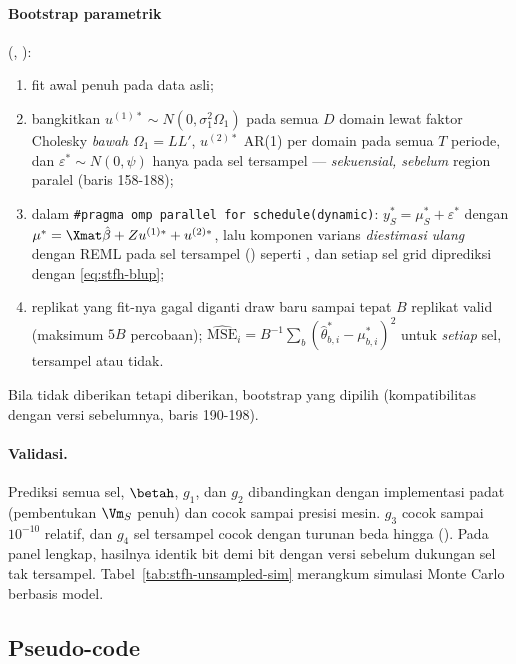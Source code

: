 \paragraph{Bootstrap parametrik} (,
):
\begin{enumerate}[label=\arabic*.]
  \item fit awal penuh pada data asli;
  \item bangkitkan $u^{(1)\ast}\sim N(0,\sigma_1^2\Omega_1)$ pada semua $D$
        domain lewat faktor Cholesky \emph{bawah} $\Omega_1=LL'$, $u^{(2)\ast}$
        AR(1) per domain pada semua $T$ periode, dan $\varepsilon^\ast\sim
        N(0,\psi)$ hanya pada sel tersampel --- \emph{sekuensial, sebelum}
        region paralel (baris 158-188);
  \item dalam \texttt{\#pragma omp parallel for schedule(dynamic)}:
        $y_S^\ast=\mu^\ast_S+\varepsilon^\ast$ dengan
        $\mu^\ast=\Xmat\hat\beta+Zu^{(1)\ast}+u^{(2)\ast}$, lalu komponen
        varians \emph{diestimasi ulang} dengan REML pada sel tersampel
        () seperti , dan setiap
        sel grid diprediksi dengan \eqref{eq:stfh-blup};
  \item replikat yang fit-nya gagal diganti draw baru sampai tepat $B$
        replikat valid (maksimum $5B$ percobaan);
        $\widehat{\mathrm{MSE}}_i=B^{-1}\sum_b(\hat\theta_{b,i}^\ast-\mu_{b,i}^\ast)^2$
        untuk \emph{setiap} sel, tersampel atau tidak.
\end{enumerate}
Bila  tidak diberikan tetapi  diberikan, bootstrap
yang dipilih (kompatibilitas dengan versi sebelumnya, baris 190-198).

\paragraph{Validasi.} Prediksi semua sel, $\betah$, $g_1$, dan $g_2$
dibandingkan dengan implementasi padat (pembentukan $\Vm_S$ penuh) dan
cocok sampai presisi mesin. $g_3$ cocok sampai $10^{-10}$ relatif, dan
$g_4$ sel tersampel cocok dengan turunan beda hingga
(). Pada panel lengkap,
hasilnya identik bit demi bit dengan versi sebelum dukungan sel tak tersampel.
Tabel~\ref{tab:stfh-unsampled-sim} merangkum simulasi Monte Carlo berbasis
model.



\subsection{Pseudo-code}\label{sec:stfh-algo}

